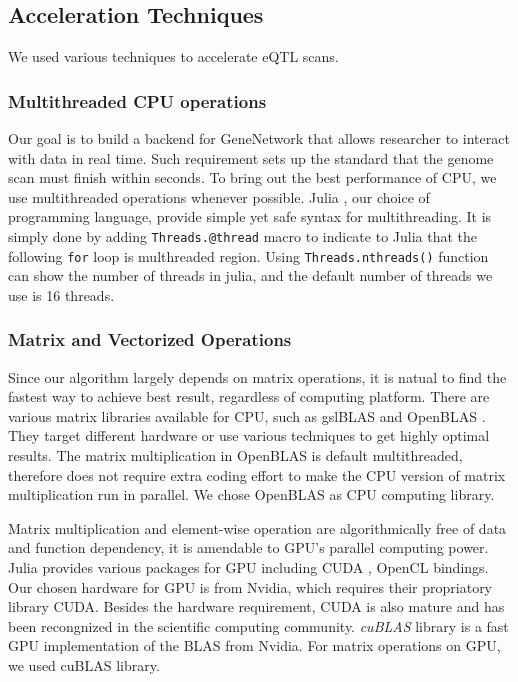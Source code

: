 \documentclass[9pt,twocolumn,twoside,lineno]{gsag3jnl}
\newcommand{\code}{\texttt}
\begin{document}
\subsection{Acceleration Techniques}
We used various techniques to accelerate eQTL scans. 
\subsubsection{Multithreaded CPU operations}
 Our goal is to build a backend for GeneNetwork that allows researcher to interact with data in real time. 
 Such requirement sets up the standard that the genome scan must finish within seconds.
 To bring out the best performance of CPU, we use multithreaded operations whenever possible. 
 Julia \citep{bezanson2017julia}, our choice of programming language, provide simple yet safe syntax for multithreading. 
 It is simply done by adding \code{Threads.@thread} macro to indicate to Julia that the following \code{for} loop is multhreaded region. 
 Using \code{Threads.nthreads()} function can show the number of threads in julia, and the default number of threads we use is 16 threads. 
  
 
\subsubsection{Matrix and Vectorized Operations}

Since our algorithm largely depends on matrix operations, it is natual to find the fastest way to achieve best result, regardless of computing platform. 
There are various matrix libraries available for CPU, such as gslBLAS and OpenBLAS \citep{wang2013augem}. 
They target different hardware or use various techniques to get highly optimal results. 
The matrix multiplication in OpenBLAS is default multithreaded, therefore does not require extra coding effort to make the CPU version of matrix multiplication run in parallel.
We chose OpenBLAS as CPU computing library.  

Matrix multiplication and element-wise operation are algorithmically free of data and function dependency, it is amendable to GPU's parallel computing power.
Julia provides various packages for GPU including CUDA \citep{Nickolls:2008:SPP:1365490.1365500}, OpenCL bindings. 
Our chosen hardware for GPU is from Nvidia, which requires their propriatory library CUDA. 
Besides the hardware requirement, CUDA is also mature and has been recongnized in the scientific computing community. 
\textit{cuBLAS} \citep{cublas} library is a fast GPU implementation of the BLAS from Nvidia. 
For matrix operations on GPU, we used cuBLAS library. 
\end{document}
